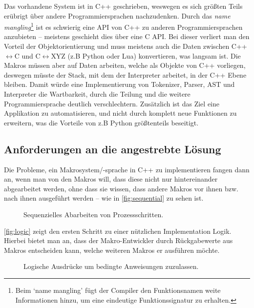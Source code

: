     Das vorhandene System ist in C++ geschrieben, weswegen es sich größten Teils erübrigt über andere Programmiersprachen nachzudenken. Durch das \emph{name mangling}\footnote{
      Beim `name mangling' fügt der Compiler den Funktionsnamen weite Informationen hinzu, um eine eindeutige Funktionssignatur zu erhalten.
    } ist es schwierig eine API von C++ zu anderen Programmiersprachen anzubieten -- meistens geschieht dies über eine C API. Bei dieser verliert man den Vorteil der Objektorientierung und muss meistens auch die Daten zwischen C++$\longleftrightarrow$C und C$\longleftrightarrow$XYZ (z.B Python oder Lua) konvertieren, was langsam ist. Die Makros müssen aber auf Daten arbeiten, welche als Objekte von C++ vorliegen, deswegen müsste der Stack, mit dem der Interpreter arbeitet, in der C++ Ebene bleiben. Damit würde eine Implementierung von Tokenizer, Parser, AST und Interpreter die Wartbarkeit, durch die Teilung und die weitere Programmiersprache deutlich verschlechtern. Zusätzlich ist das Ziel eine Applikation zu automatisieren, und nicht durch komplett neue Funktionen zu erweitern, was die Vorteile von z.B Python größtenteils beseitigt.

  \subsection{Anforderungen an die angestrebte Lösung}
  \label{ssec:Anforderungen an die angestrebte Lösung}
    Die Probleme, ein Makrosystem/-sprache in C++ zu implementieren fangen dann an, wenn man von den Makros will, dass diese nicht nur hintereinander abgearbeitet werden, ohne dass sie wissen, dass andere Makros vor ihnen bzw. nach ihnen ausgeführt werden -- wie in \autoref{fig:sequential} zu sehen ist.

    \begin{figure}[H]
      \centering
      
      \caption{Sequenzielles Abarbeiten von Prozessschritten.}
      \label{fig:sequential}
    \end{figure}

    \autoref{fig:logic} zeigt den ersten Schritt zu einer nützlichen Implementation Logik. Hierbei bietet man an, dass der Makro-Entwickler durch Rückgabewerte aus Makros entscheiden kann, welche weiteren Makros er ausführen möchte.

    \begin{figure}[H]
      \centering
      
      \caption{Logische Ausdrücke um bedingte Anweisungen zuzulassen.}
      \label{fig:logic}
    \end{figure}

